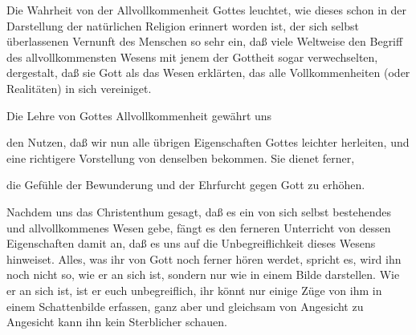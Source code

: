 Die Wahrheit von der Allvollkommenheit Gottes leuchtet, wie dieses schon in der Darstellung der natürlichen Religion erinnert worden ist, der sich selbst überlassenen Vernunft des Menschen so sehr ein, daß viele Weltweise den Begriff des allvollkommensten Wesens mit jenem der Gottheit sogar verwechselten, dergestalt, daß sie Gott als das Wesen erklärten, das alle Vollkommenheiten (oder Realitäten) in sich vereiniget.

Die Lehre von Gottes Allvollkommenheit gewährt uns
\begin{aufzb}
\item den Nutzen, daß wir nun alle übrigen Eigenschaften Gottes leichter herleiten, und eine richtigere Vorstellung von denselben bekommen. Sie dienet ferner,~
\item die Gefühle der Bewunderung und der Ehrfurcht gegen Gott zu erhöhen.
\end{aufzb}

Nachdem uns das Christenthum gesagt, daß es ein von sich selbst bestehendes und allvollkommenes Wesen gebe, fängt es den ferneren Unterricht von dessen Eigenschaften damit an, daß es uns auf die Unbegreiflichkeit dieses Wesens hinweiset. Alles, was ihr von Gott noch ferner hören werdet, spricht es, wird ihn noch nicht so, wie er an sich ist, sondern nur wie in einem Bilde darstellen. Wie er an sich ist, ist er euch unbegreiflich, ihr könnt nur einige Züge von ihm in einem Schattenbilde erfassen, ganz aber und gleichsam von Angesicht zu Angesicht kann ihn kein Sterblicher schauen.


